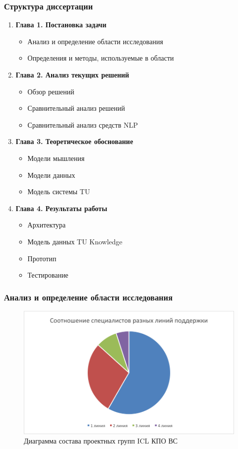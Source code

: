 \documentclass[14pt]{beamer}
\begin{document}
\begin{frame}
\frametitle{Структура диссертации}
\begin{enumerate}
  \item \textbf{Глава 1. Постановка задачи}
  \begin{itemize}
    \item Анализ и определение области исследования
    \item Определения и методы, используемые в области
  \end{itemize}
  \item \textbf{Глава 2. Анализ текущих решений}
  \begin{itemize}
    \item Обзор решений
    \item Сравнительный анализ решений
    \item Сравнительный анализ средств NLP
  \end{itemize}
  \item \textbf{Глава 3. Теоретическое обоснование}
  \begin{itemize}
    \item Модели мышления
    \item Модели данных
    \item Модель системы TU
  \end{itemize}
  \item \textbf{Глава 4. Результаты работы}
  \begin{itemize}
    \item Архитектура
    \item Модель данных TU Knowledge
    \item Прототип
    \item Тестирование
  \end{itemize}
\end{enumerate}
\end{frame}

\begin{frame}
\frametitle{Анализ и определение области исследования}
\begin{figure} [h] 
  \center
  \includegraphics [scale=0.7] {ITSMTeamComposition}
  \caption{Диаграмма состава проектных групп ICL КПО ВС} 
  \label{img:ITSMTeamComposition}  
\end{figure}

\end{frame}
\end{document}
